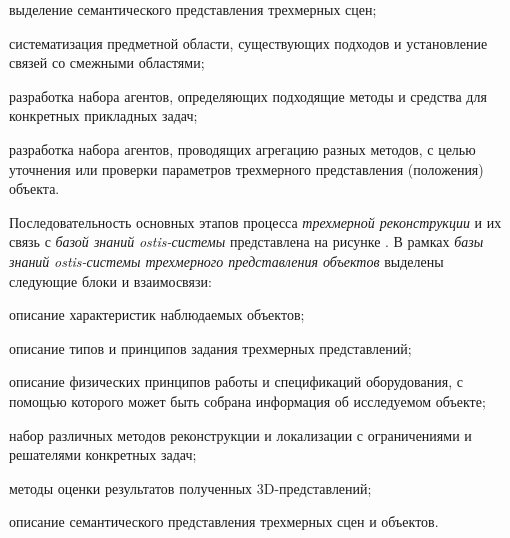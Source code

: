\begin{textitemize}
    \item выделение семантического представления трехмерных сцен;
    \item систематизация предметной области, существующих подходов и установление связей со смежными областями;
    \item разработка набора агентов, определяющих подходящие методы и средства для конкретных прикладных задач;
    \item разработка набора агентов, проводящих агрегацию разных методов, с целью уточнения или проверки параметров трехмерного представления (положения) объекта.
\end{textitemize}

Последовательность основных этапов процесса \textit{трехмерной реконструкции} и их связь с \textit{базой знаний} \textit{ostis-системы} представлена на рисунке \textit{}. В рамках \textit{базы знаний} \textit{ostis-системы трехмерного представления объектов} выделены следующие блоки и взаимосвязи:

\begin{textitemize}
    \item описание характеристик наблюдаемых объектов;
    \item описание типов и принципов задания трехмерных представлений;
    \item описание физических принципов работы и спецификаций оборудования, с помощью которого может быть собрана информация об исследуемом объекте;
    \item набор различных методов реконструкции и локализации с ограничениями и решателями конкретных задач;
    \item методы оценки результатов полученных 3D-представлений;
    \item описание семантического представления трехмерных сцен и объектов.
\end{textitemize}

